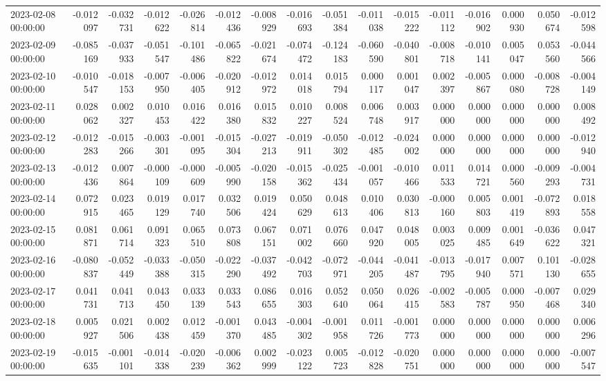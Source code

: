 \begin{tabular}{lrrrrrrrrrrrrrrr}
2023-02-08 00:00:00 & -0.012097 & -0.032731 & -0.012622 & -0.026814 & -0.012436 & -0.008929 & -0.016693 & -0.051384 & -0.011038 & -0.015222 & -0.011112 & -0.016902 & 0.000930 & 0.050674 & -0.012598 \\
2023-02-09 00:00:00 & -0.085169 & -0.037933 & -0.051547 & -0.101486 & -0.065822 & -0.021674 & -0.074472 & -0.124183 & -0.060590 & -0.040801 & -0.008718 & -0.010141 & 0.005047 & 0.053560 & -0.044566 \\
2023-02-10 00:00:00 & -0.010547 & -0.018153 & -0.007950 & -0.006405 & -0.020912 & -0.012972 & 0.014018 & 0.015794 & 0.000117 & 0.001047 & 0.002397 & -0.005867 & 0.000080 & -0.008728 & -0.004149 \\
2023-02-11 00:00:00 & 0.028062 & 0.002327 & 0.010453 & 0.016422 & 0.016380 & 0.015832 & 0.010227 & 0.008524 & 0.006748 & 0.003917 & 0.000000 & 0.000000 & 0.000000 & 0.000000 & 0.008492 \\
2023-02-12 00:00:00 & -0.012283 & -0.015266 & -0.003301 & -0.001095 & -0.015304 & -0.027213 & -0.019911 & -0.050302 & -0.012485 & -0.024002 & 0.000000 & 0.000000 & 0.000000 & 0.000000 & -0.012940 \\
2023-02-13 00:00:00 & -0.012436 & 0.007864 & -0.000109 & -0.000609 & -0.005990 & -0.020158 & -0.015362 & -0.025434 & -0.001057 & -0.010466 & 0.011533 & 0.014721 & 0.000560 & -0.009293 & -0.004731 \\
2023-02-14 00:00:00 & 0.072915 & 0.023465 & 0.019129 & 0.017740 & 0.032506 & 0.019424 & 0.050629 & 0.048613 & 0.010406 & 0.030813 & -0.000160 & 0.005803 & 0.001419 & -0.072893 & 0.018558 \\
2023-02-15 00:00:00 & 0.081871 & 0.061714 & 0.091323 & 0.065510 & 0.073808 & 0.067151 & 0.071002 & 0.076660 & 0.047920 & 0.048005 & 0.003025 & 0.009485 & 0.001649 & -0.036622 & 0.047321 \\
2023-02-16 00:00:00 & -0.080837 & -0.052449 & -0.033388 & -0.050315 & -0.022290 & -0.037492 & -0.042703 & -0.072971 & -0.044205 & -0.041487 & -0.013795 & -0.017940 & 0.007571 & 0.101130 & -0.028655 \\
2023-02-17 00:00:00 & 0.041731 & 0.041713 & 0.043450 & 0.033139 & 0.033543 & 0.086655 & 0.016303 & 0.052640 & 0.050064 & 0.026415 & -0.002583 & -0.005787 & 0.000950 & -0.007468 & 0.029340 \\
2023-02-18 00:00:00 & 0.005927 & 0.021506 & 0.002438 & 0.012459 & -0.001370 & 0.043485 & -0.004302 & -0.001958 & 0.011726 & -0.001773 & 0.000000 & 0.000000 & 0.000000 & 0.000000 & 0.006296 \\
2023-02-19 00:00:00 & -0.015635 & -0.001101 & -0.014338 & -0.020239 & -0.006362 & 0.002999 & -0.023122 & 0.005723 & -0.012828 & -0.020751 & 0.000000 & 0.000000 & 0.000000 & 0.000000 & -0.007547 \\

\end{tabular}
